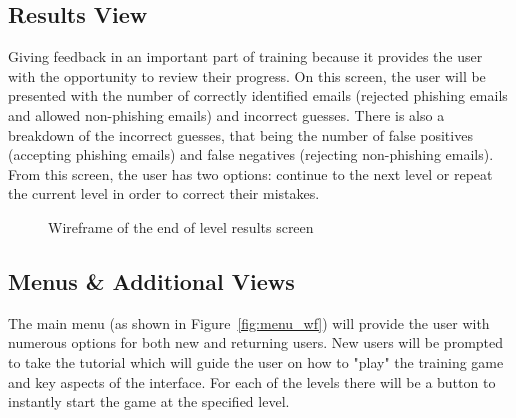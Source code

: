 \documentclass{l4proj}
\begin{document}
\subsection{Results View}
Giving feedback in an important part of training because it provides the user with the opportunity to review their progress. On this screen, the user will be presented with the number of correctly identified emails (rejected phishing emails and allowed non-phishing emails) and incorrect guesses. There is also a breakdown of the incorrect guesses, that being the number of false positives (accepting phishing emails) and false negatives (rejecting non-phishing emails). From this screen, the user has two options: continue to the next level or repeat the current level in order to correct their mistakes. 

\begin{figure}[H]
    \centering
    \caption{Wireframe of the end of level results screen}
    \label{fig:results_wf} 
\end{figure}

\subsection{Menus \& Additional Views}
The main menu (as shown in Figure~\ref{fig:menu_wf}) will provide the user with numerous options for both new and returning users. New users will be prompted to take the tutorial which will guide the user on how to "play" the training game and key aspects of the interface. For each of the levels there will be a button to instantly start the game at the specified level.
\end{document}
